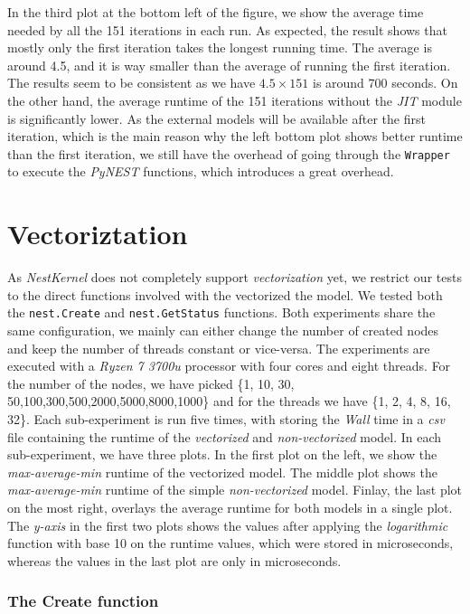 In the third plot at the bottom left of the figure, we show the average time needed by all the 151 iterations in each run. As expected, the result shows that mostly only the first iteration takes the longest running time. The average is around 4.5, and it is way smaller than the average of running the first iteration. The results seem to be consistent as we have $4.5 \times 151$ is around 700 seconds. On the other hand, the average runtime of the 151 iterations without the \emph{JIT} module is significantly lower. As the external models will be available after the first iteration, which is the main reason why the left bottom plot shows better runtime than the first iteration, we still have the overhead of going through the \texttt{Wrapper} to execute the \emph{PyNEST} functions, which introduces a great overhead.



\section{Vectoriztation}

As \emph{NestKernel} does not completely support \emph	{vectorization} yet, we restrict our tests to the direct functions involved with the vectorized the model. We tested both the \texttt{nest.Create} and \texttt{nest.GetStatus} functions. Both experiments share the same configuration, we mainly can either change the number of created nodes and keep the number of threads constant or vice-versa. The experiments are executed with a \emph{Ryzen 7 3700u} processor with four cores and eight threads.
For the number of the nodes, we have picked \{1, 10, 30, 50,100,300,500,2000,5000,8000,1000\} and for the threads we have \{1, 2, 4, 8, 16, 32\}. Each sub-experiment is run five times, with storing the \emph{Wall} time in a \emph{csv} file containing the runtime of the \emph{vectorized} and \emph{non-vectorized} model. In each sub-experiment, we have three plots. In the first plot on the left, we show the \emph{max-average-min} runtime of the vectorized model. The middle plot shows the \emph{max-average-min} runtime of the simple \emph{non-vectorized} model. Finlay, the last plot on the most right, overlays the average runtime for both models in a single plot. The \emph{y-axis} in the first two plots shows the values after applying the \emph{logarithmic} function with base 10 on the runtime values, which were stored in microseconds, whereas the values in the last plot are only in microseconds.

\subsubsection{The Create function}

